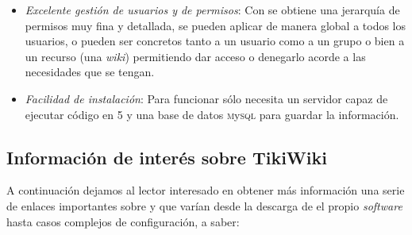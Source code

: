 \begin{itemize}
\item \textit{Excelente gestión de usuarios y de permisos}: Con \tiki{} se obtiene una jerarquía de permisos muy fina y detallada, se pueden aplicar de manera global a todos los usuarios, o pueden ser concretos tanto a un usuario como a un grupo o bien a un recurso (una \textit{wiki}) permitiendo dar acceso o denegarlo acorde a las necesidades que se tengan.

\item \textit{Facilidad de instalación}: Para funcionar \tiki{} sólo necesita un servidor capaz de ejecutar código en \php{} 5 \cite{web:php} y una base de datos \textsc{m}y\textsc{sql} \cite{web:mysql} para guardar la información.

\end{itemize}

\subsection{Información de interés sobre TikiWiki}

A continuación dejamos al lector interesado en obtener más información una serie de enlaces importantes sobre \tiki{} y que varían desde la descarga de el propio \textit{software} hasta casos complejos de configuración, a saber:

